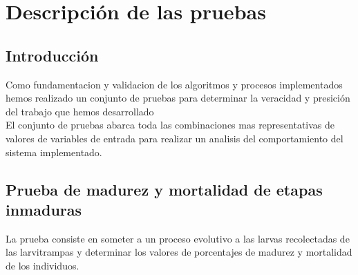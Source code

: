 \section{ Descripción de las pruebas}

\subsection{Introducción}

Como fundamentacion y validacion de los algoritmos y procesos implementados
hemos realizado un conjunto de pruebas para determinar la veracidad y presición del 
trabajo que hemos desarrollado\\

El conjunto de pruebas abarca toda las combinaciones mas representativas
de valores de variables de entrada para realizar un analisis del comportamiento 
del sistema implementado.\\

\subsection{Prueba de madurez y mortalidad de etapas inmaduras}

La prueba consiste en someter a un proceso evolutivo a las larvas 
recolectadas de las larvitrampas y determinar los valores de porcentajes 
de madurez y mortalidad de los individuos.\\

